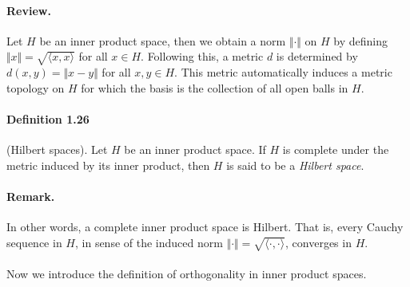 \documentclass{article}
\begin{document}
\paragraph{Review.} Let $H$ be an inner product space, then we obtain a norm $\Vert\cdot\Vert$ on $H$ by defining $\Vert x\Vert = \sqrt{\langle x,x\rangle}$ for all $x\in H$. Following this, a metric $d$ is determined by $d(x,y)=\Vert x-y\Vert$ for all $x,y\in H$. This metric automatically induces a metric topology on $H$ for which the basis is the collection of all open balls in $H$.

\paragraph{Definition 1.26\label{def:1.26}} (Hilbert spaces). Let $H$ be an inner product space. If $H$ is complete under the metric induced by its inner product, then $H$ is said to be a \textit{Hilbert space}.

\paragraph{Remark.} In other words, a complete inner product space is Hilbert. That is, every Cauchy sequence in $H$, in sense of the induced norm $\Vert\cdot\Vert=\sqrt{\langle\cdot,\cdot\rangle}$, converges in $H$.

\paragraph{} Now we introduce the definition of orthogonality in inner product spaces.
\end{document}
